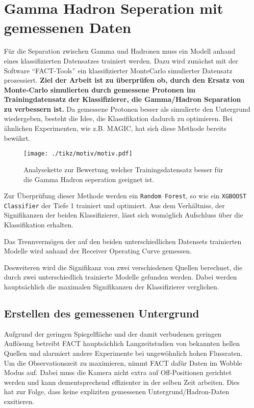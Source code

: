 \chapter{Gamma Hadron Seperation mit gemessenen Daten}
Für die Separation zwischen Gamma und Hadronen muss ein Modell anhand eines klassifizierten Datensatzes trainiert werden.
Dazu wird zunächst mit der Software ``FACT-Tools'' ein klassifizierter MonteCarlo simulierter Datensatz prozessiert.
\textbf{Ziel der Arbeit ist zu überprüfen ob, durch den Ersatz von Monte-Carlo simulierten durch gemessene Protonen im Trainingdatensatz der Klassifizierer, die Gamma/Hadron Separation zu verbessern ist.}
Da gemessene Protonen besser als simulierte den Untergrund wiedergeben, besteht die Idee, die Klassifikation dadurch zu optimieren.
Bei ähnlichen Experimenten, wie z.B. MAGIC, hat sich diese Methode bereits bewährt. 
\begin{figure}[H]
  \centering
  \texttt{[image: ./tikz/motiv/motiv.pdf]}
  \caption{Analysekette zur Bewertung welcher Trainingsdatensatz besser für die Gamma Hadron seperation geeignet ist.}
\end{figure}
Zur Überprüfung dieser Methode werden ein \texttt{Random Forest}, so wie ein \texttt{XGBOOST Classifier} der Tiefe 1 trainiert und optimiert.
Aus dem Verhältniss, der Signifikanzen der beiden Klassifizierer, lässt sich womöglich Aufschluss über die Klassifikation erhalten.

Das Trennvermögen der auf den beiden unterschiedlichen Datensets trainierten Modelle wird anhand der Receiver Operating Curve gemessen.

Desweiteren wird die Signifikanz von zwei verschiedenen Quellen berechnet, die durch zwei unterschiedlich trainierte Modelle gefunden werden. 
Dabei werden hauptsächlich die maximalen Signifikanzen der Klassifizierer verglichen.
\section{Erstellen des gemessenen Untergrund}
\label{sec:makeUnter}
Aufgrund der geringen Spiegelfläche und der damit verbudenen geringen Auflösung betreibt FACT hauptsächlich Langzeitstudien von bekannten hellen Quellen und alarmiert andere Experimente bei ungewöhnlich hohen Flussraten.
Um die Observationszeit zu maximieren, nimmt FACT dafür Daten im Wobble Modus auf. 
Dabei muss die Kamera nicht extra auf Off-Positionen gerichtet werden und kann dementsprechend effizienter in der selben Zeit arbeiten. 
Dies hat zur Folge, dass keine expliziten gemessenen Untergrund/Hadron-Daten exsitieren. 


